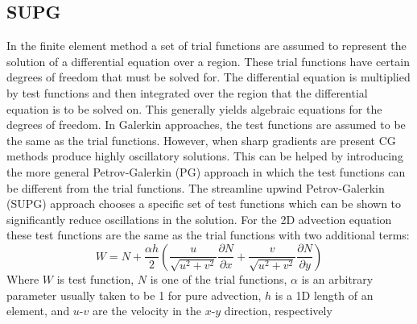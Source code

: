 \subsection{SUPG}
\label{SUPG}
In the finite element method a set of trial functions are assumed to represent the solution of a differential equation over a region. These trial functions have certain degrees of freedom that must be solved for. The differential equation is multiplied by test functions and then integrated over the region that the differential equation is to be solved on. This generally yields algebraic equations for the degrees of freedom. 
In Galerkin approaches, the test functions are assumed to be the same as the trial functions. However, when sharp gradients are present CG methods produce highly oscillatory solutions. This can be helped by introducing the more general Petrov-Galerkin (PG) approach in which the test functions can be different from the trial functions. The streamline upwind Petrov-Galerkin (SUPG) approach chooses a specific set of test functions which can be shown to significantly reduce oscillations in the solution. For the 2D advection equation these test functions are the same as the trial functions with two additional terms:
\begin{equation}
W = N + \frac{\alpha h}{2}\left(\frac{u}{\sqrt{u^2+v^2}}\frac{\partial N}{\partial x} + \frac{v}{\sqrt{u^2+v^2}}\frac{\partial N}{\partial y}\right)
\end{equation}
Where $W$ is test function, $N$ is one of the trial functions, $\alpha$ is an arbitrary parameter usually taken to be 1 for pure advection, $h$ is a 1D length of an element, and $u$-$v$ are the velocity in the $x$-$y$ direction, respectively
